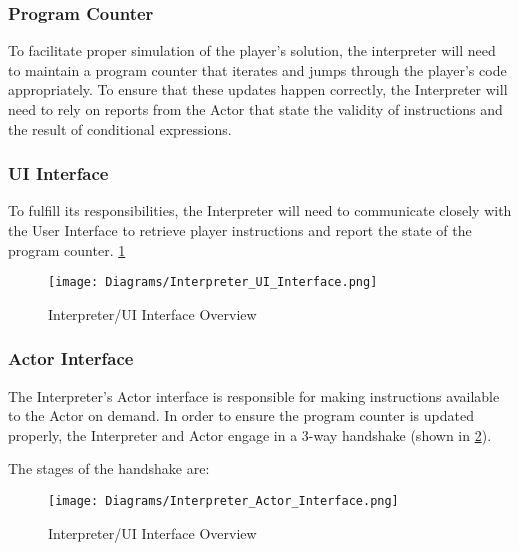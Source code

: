 \subsubsection{Program Counter}
To facilitate proper simulation of the player's solution, the interpreter will need to maintain a program counter that iterates and jumps through the player's code appropriately. To ensure that these updates happen correctly, the Interpreter will need to rely on reports from the Actor that state the validity of instructions and the result of conditional expressions.

\subsubsection{UI Interface}
To fulfill its responsibilities, the Interpreter will need to communicate closely with the User Interface to retrieve player instructions and report the state of the program counter. \ref{fig:interpreter_UI_interface}

\begin{figure}[!hb]
    \caption{Interpreter/UI Interface Overview}
    \label{fig:interpreter_UI_interface}
    \centering
    \texttt{[image: Diagrams/Interpreter\_UI\_Interface.png]}
\end{figure}

\subsubsection{Actor Interface}
The Interpreter's Actor interface is responsible for making instructions available to the Actor on demand. In order to ensure the program counter is updated properly, the Interpreter and Actor engage in a 3-way handshake (shown in \ref{fig:interpreter_Actor_interface}). 

The stages of the handshake are:

\begin{figure}[!hb]
    \caption{Interpreter/UI Interface Overview}
    \label{fig:interpreter_Actor_interface}
    \centering
    \texttt{[image: Diagrams/Interpreter\_Actor\_Interface.png]}
\end{figure}

